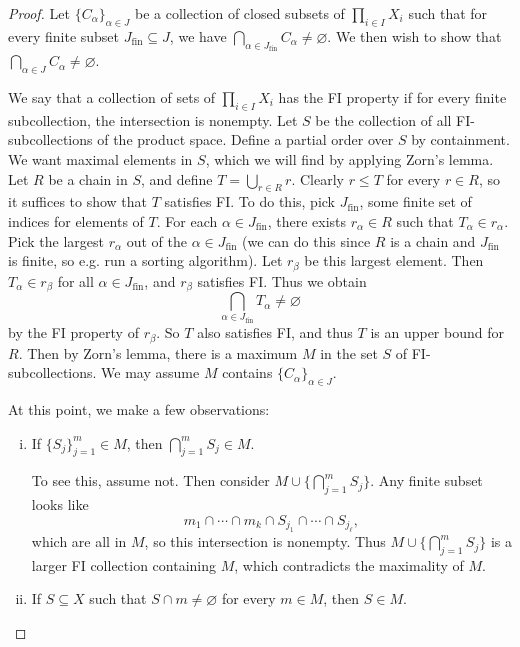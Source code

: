 \begin{proof}
  Let $\{C_\alpha\}_{\alpha \in J}$ be a collection
  of closed subsets of $\prod_{i \in I} X_i$
  such that for every finite subset
  $J_\text{fin} \subseteq J$, we have
  $\bigcap_{\alpha \in J_\text{fin}} C_\alpha \ne \varnothing$.
  We then wish to show that $\bigcap_{\alpha \in J} C_\alpha \ne \varnothing$.

  We say that a collection of sets of
  $\prod_{i \in I} X_i$ has the FI property if
  for every finite subcollection, the intersection is
  nonempty. Let $S$ be the collection of all
  FI-subcollections of the product space. Define
  a partial order over $S$ by containment. We want
  maximal elements in $S$, which we will find by
  applying Zorn's lemma. Let $R$ be a chain in $S$,
  and define $T = \bigcup_{r \in R} r$. Clearly
  $r \le T$ for every $r \in R$, so it suffices
  to show that $T$ satisfies FI. To do this, pick
  $J_\text{fin}$, some finite set of indices for
  elements of $T$. For each $\alpha \in J_\text{fin}$,
  there exists $r_\alpha \in R$ such that
  $T_\alpha \in r_\alpha$. Pick the largest
  $r_\alpha$ out of the $\alpha \in J_\text{fin}$
  (we can do this since $R$ is a chain and
  $J_\text{fin}$ is finite, so e.g. run a sorting
  algorithm). Let $r_\beta$ be this largest element.
  Then $T_\alpha \in r_\beta$ for all
  $\alpha \in J_\text{fin}$, and $r_\beta$ satisfies
  FI. Thus we obtain
  \[
    \bigcap_{\alpha \in J_\text{fin}} T_\alpha
    \ne \varnothing
  \]
  by the FI property of $r_\beta$. So $T$ also
  satisfies FI, and thus $T$ is an upper bound
  for $R$. Then by Zorn's lemma, there is
  a maximum $M$ in the set $S$ of
  FI-subcollections. We may assume
  $M$ contains $\{C_\alpha\}_{\alpha \in J}$.

  At this point, we make a few observations:
  \begin{enumerate}[(i)]
    \item If $\{S_j\}_{j = 1}^m \in M$, then
      $\bigcap_{j = 1}^m S_j \in M$.

      To see this, assume not. Then consider
      $M \cup \{\bigcap_{j = 1}^m S_j\}$.
      Any finite subset looks like
      \[
        m_1 \cap \cdots \cap m_k \cap S_{j_1} \cap \cdots \cap S_{j_\ell},
      \]
      which are all in $M$, so this intersection
      is nonempty. Thus $M \cup \{\bigcap_{j = 1}^m S_j\}$
      is a larger FI collection containing $M$,
      which contradicts the maximality of $M$.
    \item If $S \subseteq X$ such that
      $S \cap m \ne \varnothing$ for every $m \in M$,
      then $S \in M$.


\end{enumerate}
\end{proof}
